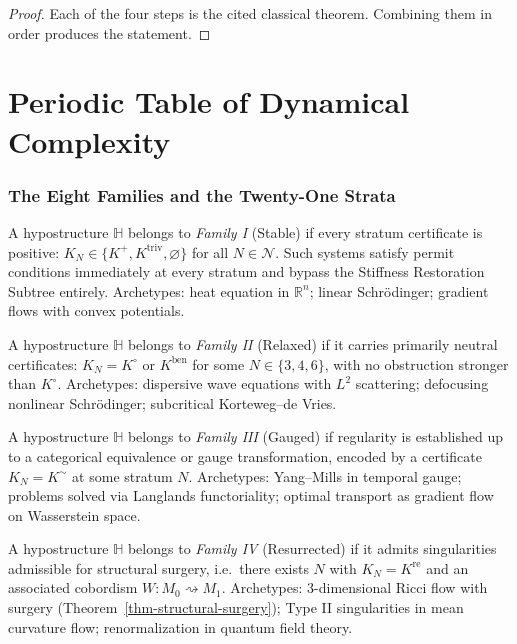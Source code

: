 \begin{proof}
Each of the four steps is the cited classical theorem. Combining them in order produces the statement.
\end{proof}

\part{Periodic Table of Dynamical Complexity}

\section{The Eight Families and the Twenty-One Strata}

\begin{definition}\label{def-family-stable}
A hypostructure $\mathbb H$ belongs to \emph{Family I} (Stable) if every stratum certificate is positive: $K_N \in \{K^+, K^{\mathrm{triv}}, \varnothing\}$ for all $N \in \mathcal N$. Such systems satisfy permit conditions immediately at every stratum and bypass the Stiffness Restoration Subtree entirely. Archetypes: heat equation in $\mathbb R^n$; linear Schr\"odinger; gradient flows with convex potentials.
\end{definition}

\begin{definition}\label{def-family-relaxed}
A hypostructure $\mathbb H$ belongs to \emph{Family II} (Relaxed) if it carries primarily neutral certificates: $K_N = K^\circ$ or $K^{\mathrm{ben}}$ for some $N \in \{3,4,6\}$, with no obstruction stronger than $K^\circ$. Archetypes: dispersive wave equations with $L^2$ scattering; defocusing nonlinear Schr\"odinger; subcritical Korteweg--de Vries.
\end{definition}

\begin{definition}\label{def-family-gauged}
A hypostructure $\mathbb H$ belongs to \emph{Family III} (Gauged) if regularity is established up to a categorical equivalence or gauge transformation, encoded by a certificate $K_N = K^{\sim}$ at some stratum $N$. Archetypes: Yang--Mills in temporal gauge; problems solved via Langlands functoriality; optimal transport as gradient flow on Wasserstein space.
\end{definition}

\begin{definition}\label{def-family-resurrected}
A hypostructure $\mathbb H$ belongs to \emph{Family IV} (Resurrected) if it admits singularities admissible for structural surgery, i.e.\ there exists $N$ with $K_N = K^{\mathrm{re}}$ and an associated cobordism $W : M_0 \rightsquigarrow M_1$. Archetypes: $3$-dimensional Ricci flow with surgery (Theorem~\ref{thm-structural-surgery}); Type II singularities in mean curvature flow; renormalization in quantum field theory.
\end{definition}

